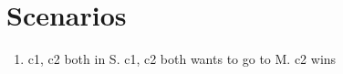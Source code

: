 \section{Scenarios}
\label{sec:scenario}

\begin{enumerate}
\item c1, c2 both in S. c1, c2 both wants to go to M. c2 wins
\end{enumerate}
